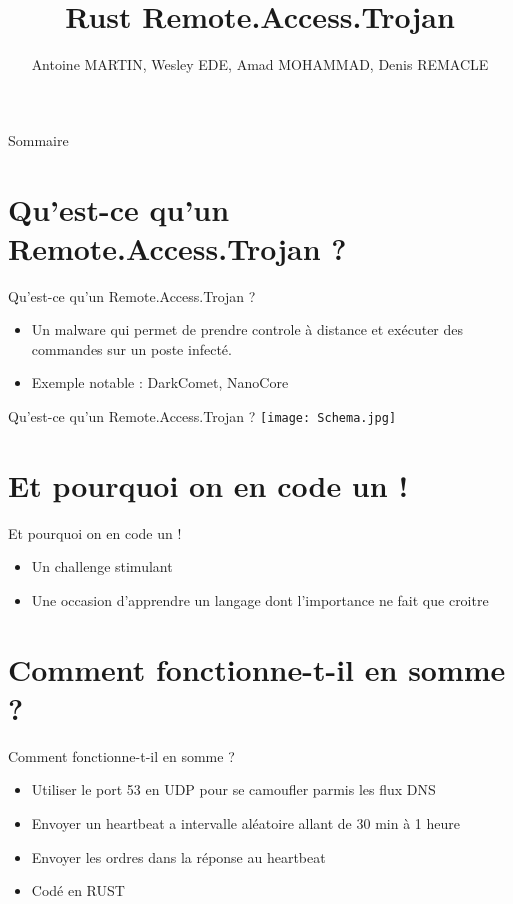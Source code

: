 \documentclass{beamer}
\title{Rust Remote.Access.Trojan}
\author{Antoine MARTIN, Wesley EDE, Amad MOHAMMAD, Denis REMACLE}
\begin{document}
  \begin{frame}
 \maketitle
  \end{frame}

\begin{frame}{Sommaire}
    \tableofcontents
\end{frame}

\section{Qu'est-ce qu'un Remote.Access.Trojan ?}
  \begin{frame}{Qu'est-ce qu'un Remote.Access.Trojan ?}
  \begin{itemize}
	\item Un malware qui permet de prendre controle à distance et exécuter des commandes sur un poste infecté.
	\item Exemple notable : DarkComet, NanoCore
  \end{itemize}
  \end{frame}

  \begin{frame}{Qu'est-ce qu'un Remote.Access.Trojan ?}
\texttt{[image: Schema.jpg]}
  \end{frame}

\section{Et pourquoi on en code un !}
  \begin{frame}{Et pourquoi on en code un !}
  \begin{itemize}
	\item Un challenge stimulant
	\item Une occasion d'apprendre un langage dont l'importance ne fait que croitre
  \end{itemize}
  \end{frame}

\section{Comment fonctionne-t-il en somme ?}
  \begin{frame}{Comment fonctionne-t-il en somme ?}
  \begin{itemize}
	\item Utiliser le port 53 en UDP pour se camoufler parmis les flux DNS
	\item Envoyer un heartbeat a intervalle aléatoire allant de 30 min à 1 heure
	\item Envoyer les ordres dans la réponse au heartbeat
	\item Codé en RUST
  \end{itemize}
  \end{frame}
\end{document}
